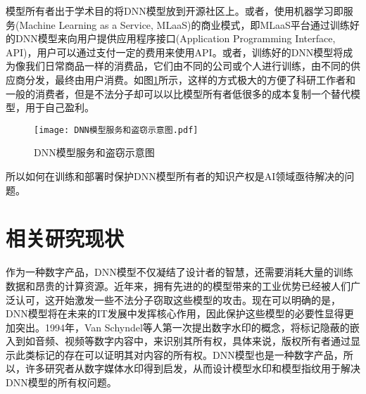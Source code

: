 模型所有者出于学术目的将DNN模型放到开源社区上。或者，使用机器学习即服务(Machine Learning as a Service, MLaaS)\cite{ribeiro2015mlaas}的商业模式，即MLaaS平台通过训练好的DNN模型来向用户提供应用程序接口(Application Programming Interface, API)\cite{ofoeda2019application}，用户可以通过支付一定的费用来使用API。或者，训练好的DNN模型将成为像我们日常商品一样的消费品，它们由不同的公司或个人进行训练，由不同的供应商分发，最终由用户消费。如图\ref{DNN模型服务和盗窃示意图}所示，这样的方式极大的方便了科研工作者和一般的消费者，但是不法分子却可以以比模型所有者低很多的成本复制一个替代模型，用于自己盈利。

\begin{figure}[htbp]%
	\centering
	\texttt{[image: DNN模型服务和盗窃示意图.pdf]}
	\setlength{\abovecaptionskip}{5mm} %
	\caption{DNN模型服务和盗窃示意图}
	\label{DNN模型服务和盗窃示意图}
	\end {figure}
	
所以如何在训练和部署时保护DNN模型所有者的知识产权是AI领域亟待解决的问题。


\section{相关研究现状}

作为一种数字产品，DNN模型不仅凝结了设计者的智慧，还需要消耗大量的训练数据和昂贵的计算资源。近年来，拥有先进的的模型带来的工业优势已经被人们广泛认可，这开始激发一些不法分子窃取这些模型的攻击\cite{tramer2016stealing,duddu2018stealing}。现在可以明确的是，DNN模型将在未来的IT发展中发挥核心作用，因此保护这些模型的必要性显得更加突出。1994年，Van Schyndel等人\cite{van1994digital}第一次提出数字水印的概念，将标记隐蔽的嵌入到如音频、视频等数字内容中，来识别其所有权，具体来说，版权所有者通过显示此类标记的存在可以证明其对内容的所有权。DNN模型也是一种数字产品，所以，许多研究者从数字媒体水印得到启发，从而设计模型水印和模型指纹用于解决DNN模型的所有权问题。

